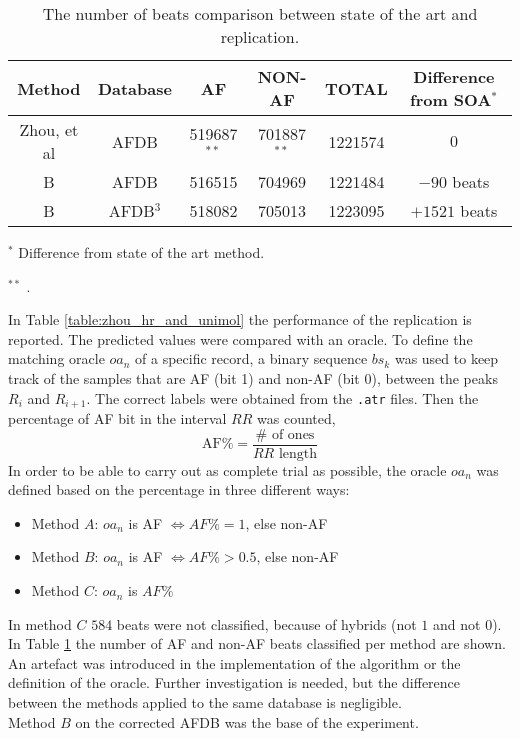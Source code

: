 \begin{table}
\begin{center}
\begin{threeparttable}
\caption{The number of beats comparison between state of the art and replication.}
\label{table:replication_error}
\scriptsize
  \begin{tabular}{c c c c c c}
  \toprule
  \textbf{Method} & \textbf{Database} & \textbf{AF} & \textbf{NON-AF} & \textbf{TOTAL} & \textbf{Difference from SOA}$^*$ \\
  \midrule  
  Zhou, et al\cite{zhou2015} & AFDB & 519687$^{**}$ & 701887$^{**}$ & 1221574 & $0$ \\
  B & AFDB & 516515 & 704969 & 1221484 & $-90$ beats\\
  B & AFDB$^3$ & 518082 & 705013 & 1223095 & $+1521$ beats \\
  \bottomrule
\end{tabular}
\begin{tablenotes}
 	\item $^*$ Difference from state of the art method.
 	\item $^{**}$ \cite[p. 9]{zhou2015}.
    \end{tablenotes}
\end{threeparttable}
\end{center}
\end{table}
In Table \ref{table:zhou_hr_and_unimol} the performance of the replication is reported. The predicted values were compared with an oracle. To define the matching oracle $oa_n$ of a specific record, a binary sequence $bs_k$ was used to keep track of the samples that are AF (bit 1) and non-AF (bit 0), between the peaks $R_i$ and $R_{i+1}$. The correct labels were obtained from the \verb|.atr| files. Then the percentage of AF bit in the interval $RR$ was counted,
\begin{equation}
 \text{AF\%} = \frac{\# \text{ of ones}}{RR \text{ length}}
\end{equation}
In order to be able to carry out as complete trial as possible, the oracle $oa_n$ was defined based on the percentage in three different ways:
\begin{itemize}
\item Method $A$: $oa_n$ is AF $\iff AF\% = 1$, else non-AF
\item Method $B$: $oa_n$ is AF $\iff AF\% > 0.5$, else non-AF
\item Method $C$: $oa_n$ is $AF\%$
\end{itemize}
In method $C$ $584$ beats were not classified, because of hybrids (not $1$ and not $0$). In Table \ref{table:replication_error} the number of AF and non-AF beats classified per method are shown. An artefact was introduced in the implementation of the algorithm or the definition of the oracle. Further investigation is needed, but the difference between the methods applied to the same database is negligible. \\
Method $B$ on the corrected AFDB was the base of the experiment.

